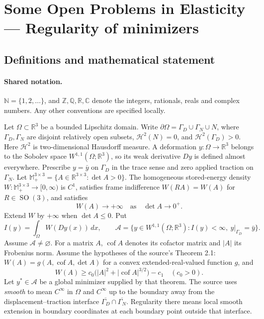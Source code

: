 \documentclass[11pt]{book}
\begin{document}
\section{Some Open Problems in Elasticity — Regularity of minimizers}\label{statement}

\subsection{Definitions and mathematical statement}

\paragraph{Shared notation.}$\mathbb N=\{1,2,\ldots\}$, and $\mathbb Z,\mathbb Q,\mathbb R,\mathbb C$ denote the integers, rationals, reals and complex numbers. Any other conventions are specified locally.


Let $\Omega\subset\mathbb R^3$ be a bounded Lipschitz domain. Write $\partial\Omega=\Gamma_D\cup\Gamma_N\cup N$, where $\Gamma_D,\Gamma_N$ are disjoint relatively open subsets, $\mathcal H^2(N)=0$, and $\mathcal H^2(\Gamma_D)>0$. Here $\mathcal H^2$ is two-dimensional Hausdorff measure. A deformation $y:\Omega\to\mathbb R^3$ belongs to the Sobolev space $W^{1,1}(\Omega;\mathbb R^3)$, so its weak derivative $Dy$ is defined almost everywhere. Prescribe $y=\bar y$ on $\Gamma_D$ in the trace sense and zero applied traction on $\Gamma_N$.
Let $\mathbb M_+^{3\times3}=\{A\in\mathbb R^{3\times3}:\det A>0\}$. The homogeneous stored-energy density $W:\mathbb M_+^{3\times3}\to[0,\infty)$ is $C^1$, satisfies frame indifference $W(RA)=W(A)$ for $R\in\operatorname{SO}(3)$, and satisfies
\[
 W(A)\longrightarrow+\infty\quad\text{as}\quad\det A\longrightarrow0^+.
\]
Extend $W$ by $+\infty$ when $\det A\le0$. Put
\[
 I(y)=\int_\Omega W(Dy(x))\,dx,\qquad
 \mathcal A=\{y\in W^{1,1}(\Omega;\mathbb R^3):I(y)<\infty,\ y|_{\Gamma_D}=\bar y\}.
\]
Assume $\mathcal A\ne\varnothing$. For a matrix $A$, $\operatorname{cof}A$ denotes its cofactor matrix and $|A|$ its Frobenius norm.
Assume the hypotheses of the source's Theorem 2.1: $W(A)=g(A,\operatorname{cof}A,\det A)$ for a convex extended-real-valued function $g$, and
\[
 W(A)\ge c_0\bigl(|A|^2+|\operatorname{cof}A|^{3/2}\bigr)-c_1
 \quad(c_0>0).
\]
Let $y^*\in\mathcal A$ be a global minimizer supplied by that theorem. The source uses \emph{smooth} to mean $C^\infty$ in $\Omega$ and $C^\infty$ up to the boundary away from the displacement--traction interface $\overline{\Gamma_D}\cap\overline{\Gamma_N}$. Regularity there means local smooth extension in boundary coordinates at each boundary point outside that interface.
\end{document}
